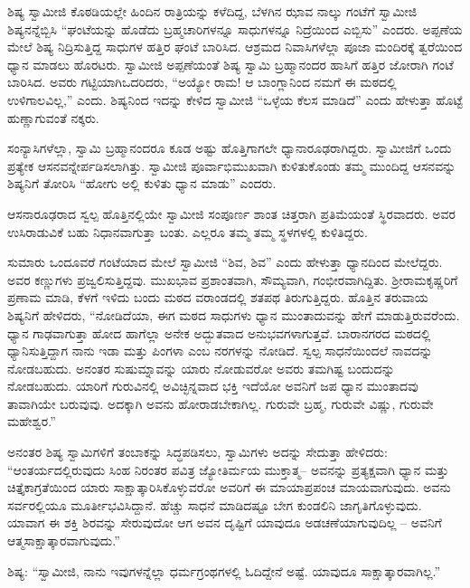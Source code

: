  ಶಿಷ್ಯ ಸ್ವಾಮೀಜಿ ಕೊಠಡಿಯಲ್ಲೇ ಹಿಂದಿನ ರಾತ್ರಿಯನ್ನು ಕಳೆದಿದ್ದ, ಬೆಳಗಿನ ಝಾವ ನಾಲ್ಕು ಗಂಟೆಗೆ ಸ್ವಾಮೀಜಿ ಶಿಷ್ಯನನ್ನೆಬ್ಬಿಸಿ “ಘಂಟೆಯನ್ನು ಹೊಡೆದು ಬ್ರಹ್ಮಚಾರಿಗಳನ್ನೂ ಸಾಧುಗಳನ್ನೂ ನಿದ್ರೆಯಿಂದ ಎಬ್ಬಿಸು” ಎಂದರು. ಅಪ್ಪಣೆಯ ಮೇಲೆ ಶಿಷ್ಯ ನಿದ್ರಿಸುತ್ತಿದ್ದ ಸಾಧುಗಳ ಹತ್ತಿರ ಘಂಟೆ ಬಾರಿಸಿದ. ಆಶ್ರಮದ ನಿವಾಸಿಗಳೆಲ್ಲಾ ಪೂಜಾ ಮಂದಿರಕ್ಕೆ ತ್ವರೆಯಿಂದ ಧ್ಯಾನ ಮಾಡಲು ಹೊರಟರು. ಸ್ವಾಮೀಜಿ ಅಪ್ಪಣೆಯಂತೆ ಶಿಷ್ಯ ಸ್ವಾಮಿ ಬ್ರಹ್ಮಾನಂದರ ಹಾಸಿಗೆ ಹತ್ತಿರ ಜೋರಾಗಿ ಗಂಟೆ ಬಾರಿಸಿದ. ಅವರು ಗಟ್ಟಿಯಾಗಿ\break ಒದರಿದರು, “ಅಯ್ಯೋ ರಾಮ! ಆ ಬಾಂಗ್ಲಾನಿಂದ ನಮಗೆ ಈ ಮಠದಲ್ಲಿ ಉಳಿಗಾಲವಿಲ್ಲ,” ಎಂದು. ಶಿಷ್ಯನಿಂದ ಇದನ್ನು ಕೇಳಿದ ಸ್ವಾಮೀಜಿ “ಒಳ್ಳೆಯ ಕೆಲಸ ಮಾಡಿದೆ” ಎಂದು ಹೇಳುತ್ತಾ ಹೊಟ್ಟೆ ಹುಣ್ಣಾಗುವಂತೆ ನಕ್ಕರು. 

 ಸಂನ್ಯಾಸಿಗಳೆಲ್ಲಾ, ಸ್ವಾಮಿ ಬ್ರಹ್ಮಾನಂದರೂ ಕೂಡ ಅಷ್ಟು ಹೊತ್ತಿಗಾಗಲೇ ಧ್ಯಾನಾರೂಢರಾಗಿದ್ದರು. ಸ್ವಾಮೀಜಿಗೆ ಒಂದು ಪ್ರತ್ಯೇಕ ಆಸನವನ್ನೇರ್ಪಡಿಸಲಾಗಿತ್ತು. ಸ್ವಾಮೀಜಿ ಪೂರ್ವಾಭಿಮುಖವಾಗಿ ಕುಳಿತುಕೊಂಡು ತಮ್ಮ ಮುಂದಿದ್ದ ಆಸನವನ್ನು ಶಿಷ್ಯನಿಗೆ ತೋರಿಸಿ “ಹೋಗು ಅಲ್ಲಿ ಕುಳಿತು ಧ್ಯಾನ ಮಾಡು” ಎಂದರು. 

 ಆಸನಾರೂಢರಾದ ಸ್ವಲ್ಪ ಹೊತ್ತಿನಲ್ಲಿಯೇ ಸ್ವಾಮೀಜಿ ಸಂಪೂರ್ಣ ಶಾಂತ ಚಿತ್ತರಾಗಿ ಪ್ರತಿಮೆಯಂತೆ ಸ್ಥಿರವಾದರು. ಅವರ ಉಸಿರಾಡುವಿಕೆ ಬಹು ನಿಧಾನವಾಗುತ್ತಾ ಬಂತು. ಎಲ್ಲರೂ ತಮ್ಮ ತಮ್ಮ ಸ್ಥಳಗಳಲ್ಲಿ ಕುಳಿತಿದ್ದರು. 

 ಸುಮಾರು ಒಂದೂವರೆ ಗಂಟೆಯಾದ ಮೇಲೆ ಸ್ವಾಮೀಜಿ “ಶಿವ, ಶಿವ” ಎಂದು ಹೇಳುತ್ತಾ ಧ್ಯಾನದಿಂದ ಮೇಲೆದ್ದರು. ಅವರ ಕಣ್ಣುಗಳು ಪ್ರಜ್ವಲಿಸುತ್ತಿದ್ದವು. ಮುಖಭಾವ ಪ್ರಶಾಂತವಾಗಿ, ಸೌಮ್ಯವಾಗಿ, ಗಂಭೀರವಾಗಿದ್ದಿತು. ಶ‍್ರೀರಾಮಕೃಷ್ಣರಿಗೆ ಪ್ರಣಾಮ ಮಾಡಿ, ಕೆಳಗೆ ಇಳಿದು ಬಂದು ಮಠದ ವರಾಂಡದಲ್ಲಿ ಶತಪಥ ತಿರುಗುತ್ತಿದ್ದರು. ಹೊತ್ತಿನ ತರುವಾಯ ಶಿಷ್ಯನಿಗೆ ಹೇಳಿದರು, “ನೋಡಿದೆಯಾ, ಈಗ ಮಠದ ಸಾಧುಗಳು ಧ್ಯಾನ ಮುಂತಾದುವನ್ನು ಹೇಗೆ ಮಾಡುತ್ತಿರುವರೆಂದು. ಧ್ಯಾನ ಗಾಢವಾಗುತ್ತಾ ಹೋದ ಹಾಗೆಲ್ಲಾ ಅನೇಕ ಅದ್ಭುತವಾದ ಅನುಭವಗಳಾಗುತ್ತವೆ. ಬಾರಾನಗರದ ಮಠದಲ್ಲಿ ಧ್ಯಾನಿಸುತ್ತಿದ್ದಾಗ ನಾನು ಇಡಾ ಮತ್ತು ಪಿಂಗಳಾ ಎಂಬ ನರಗಳನ್ನು ನೋಡಿದೆ. ಸ್ವಲ್ಪ ಸಾಧನೆಯಿಂದಲೆ ನಾವದನ್ನು ನೋಡಬಹುದು. ಅನಂತರ ಸುಷುಮ್ನಾವನ್ನು ಯಾರು ನೋಡುವರೋ ಅವರು ತಮಗಿಷ್ಟ ಬಂದುದನ್ನು ನೋಡಬಹುದು. ಯಾರಿಗೆ ಗುರುವಿನಲ್ಲಿ ಅವಿಚ್ಛಿನ್ನವಾದ ಭಕ್ತಿ ಇದೆಯೋ ಅವನಿಗೆ ಜಪ ಧ್ಯಾನ ಮುಂತಾದವು ತಾವಾಗಿಯೇ ಬರುವುವು. ಅದಕ್ಕಾಗಿ ಅವನು ಹೋರಾಡಬೇಕಾಗಿಲ್ಲ. ಗುರುವೇ ಬ್ರಹ್ಮ, ಗುರುವೇ ವಿಷ್ಣು, ಗುರುವೇ ಮಹೇಶ್ವರ.” 

 ಅನಂತರ ಶಿಷ್ಯ ಸ್ವಾಮಿಗಳಿಗೆ ತಂಬಾಕನ್ನು ಸಿದ್ಧಪಡಿಸಲು, ಸ್ವಾಮಿಗಳು ಅದನ್ನು ಸೇದುತ್ತಾ ಹೇಳಿದರು: “ಆಂತರ್ಯದಲ್ಲಿರುವುದು ಸಿಂಹ ನಿರಂತರ ಪವಿತ್ರ ಜ್ಯೋತಿರ್ಮಯ ಮುಕ್ತಾತ್ಮ– ಅವನನ್ನು ಪ್ರತ್ಯಕ್ಷವಾಗಿ ಧ್ಯಾನ ಮತ್ತು ಚಿತ್ತೈಕಾಗ್ರತೆಯಿಂದ ಯಾರು ಸಾಕ್ಷಾತ್ಕಾರಿಸಿಕೊಳ್ಳುವರೋ ಅವರಿಗೆ ಈ ಮಾಯಾಪ್ರಪಂಚ ಮಾಯವಾಗುವುದು. ಅವನು ಸರ್ವರಲ್ಲಿಯೂ ಮೂರ್ತೀಭವಿಸಿದ್ದಾನೆ. ಹೆಚ್ಚು ಸಾಧನೆ ಮಾಡಿದಷ್ಟೂ ಬೇಗ ಕುಂಡಲಿನಿ ಜಾಗೃತಿಗೊಳ್ಳುವುದು. ಯಾವಾಗ ಈ ಶಕ್ತಿ ಶಿರವನ್ನು ಸೇರುವುದೋ ಆಗ ಅವನ ದೃಷ್ಟಿಗೆ ಯಾವುದೂ ಅಡಚಣೆಯಾಗುವುದಿಲ್ಲ – ಅವನಿಗೆ ಆತ್ಮಸಾಕ್ಷಾತ್ಕಾರವಾಗುವುದು.” 

 ಶಿಷ್ಯ: “ಸ್ವಾಮೀಜಿ, ನಾನು ಇವುಗಳನ್ನೆಲ್ಲಾ ಧರ್ಮಗ್ರಂಥಗಳಲ್ಲಿ ಓದಿದ್ದೇನೆ ಅಷ್ಟೆ. ಯಾವುದೂ ಸಾಕ್ಷಾತ್ಕಾರವಾಗಿಲ್ಲ.” 

